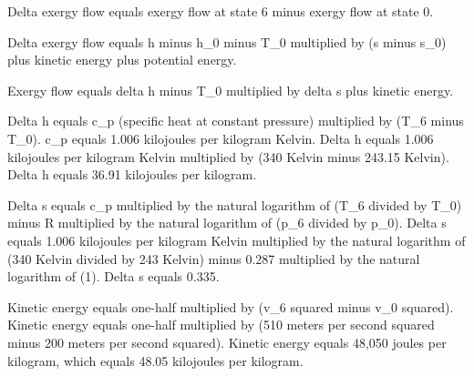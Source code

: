 Delta exergy flow equals exergy flow at state 6 minus exergy flow at state 0.  

Delta exergy flow equals h minus h_0 minus T_0 multiplied by (s minus s_0) plus kinetic energy plus potential energy.  

Exergy flow equals delta h minus T_0 multiplied by delta s plus kinetic energy.  

Delta h equals c_p (specific heat at constant pressure) multiplied by (T_6 minus T_0).  
c_p equals 1.006 kilojoules per kilogram Kelvin.  
Delta h equals 1.006 kilojoules per kilogram Kelvin multiplied by (340 Kelvin minus 243.15 Kelvin).  
Delta h equals 36.91 kilojoules per kilogram.  

Delta s equals c_p multiplied by the natural logarithm of (T_6 divided by T_0) minus R multiplied by the natural logarithm of (p_6 divided by p_0).  
Delta s equals 1.006 kilojoules per kilogram Kelvin multiplied by the natural logarithm of (340 Kelvin divided by 243 Kelvin) minus 0.287 multiplied by the natural logarithm of (1).  
Delta s equals 0.335.  

Kinetic energy equals one-half multiplied by (v_6 squared minus v_0 squared).  
Kinetic energy equals one-half multiplied by (510 meters per second squared minus 200 meters per second squared).  
Kinetic energy equals 48,050 joules per kilogram, which equals 48.05 kilojoules per kilogram.